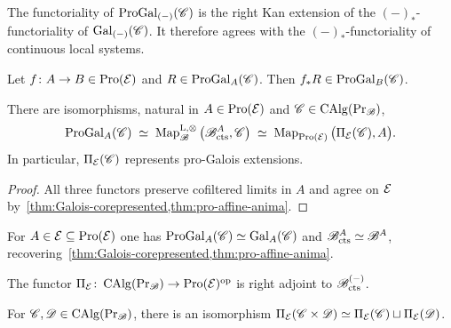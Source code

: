 \documentclass[english,svgnames,table]{article}
\begin{document}
    The functoriality of $\mathrm{ProGal}_{(-)}(\mathscr{C})$ is the right Kan extension of the $(-)_*$-functoriality of $\mathrm{Gal}_{(-)}(\mathscr{C})$. It therefore agrees with the $(-)_*$-functoriality of continuous local systems.

    \begin{corollary}
        Let $f \colon A \to B \in \operatorname{Pro}(\mathcal{E})$ and $R \in \mathrm{ProGal}_A(\mathscr{C})$. Then $f_* R \in \mathrm{ProGal}_B(\mathscr{C})$.
    \end{corollary}

    \begin{proposition}
    \label{prop:pro-Galois-classification}
        There are isomorphisms, natural in $A \in \operatorname{Pro}(\mathcal{E})$ and $\mathscr{C} \in \operatorname{CAlg}(\operatorname{Pr}_{\mathscr{B}})$,
        \begin{equation*}
                \mathrm{ProGal}_A(\mathscr{C})
                \;\simeq\; \operatorname{Map}^{\mathrm{L},\otimes}_{\mathscr{B}}\big(\mathscr{B}_{\mathrm{cts}}^A, \mathscr{C}\big)
                \;\simeq\; \operatorname{Map}_{\operatorname{Pro}(\mathcal{E})}\big(\Pi_{\mathcal{E}}(\mathscr{C}), A\big).
        \end{equation*}
        In particular, $\Pi_{\mathcal{E}}(\mathscr{C})$ represents pro-Galois extensions.
    \end{proposition}
    \begin{proof}
        All three functors preserve cofiltered limits in $A$ and agree on $\mathcal{E}$ by~\cref{thm:Galois-corepresented,thm:pro-affine-anima}.
    \end{proof}

    For $A \in \mathcal{E} \subseteq \operatorname{Pro}(\mathcal{E})$ one has $\mathrm{ProGal}_A(\mathscr{C}) \simeq \mathrm{Gal}_A(\mathscr{C})$ and $\mathscr{B}^A_{\mathrm{cts}} \simeq \mathscr{B}^A$, recovering~\cref{thm:Galois-corepresented,thm:pro-affine-anima}.

    \begin{corollary}
    \label{cor:piT-right-adjoint}
        The functor $\Pi_{\mathcal{E}} \colon \operatorname{CAlg}(\operatorname{Pr}_{\mathscr{B}}) \to \operatorname{Pro}(\mathcal{E})^{\mathrm{op}}$ is right adjoint to $\mathscr{B}_{\mathrm{cts}}^{(-)}$.
    \end{corollary}

    \begin{corollary}
       For $\mathscr{C}, \mathscr{D} \in \operatorname{CAlg}(\operatorname{Pr}_{\mathscr{B}})$, there is an isomorphism $\Pi_{\mathcal{E}}(\mathscr{C} \times \mathscr{D}) \simeq \Pi_{\mathcal{E}}(\mathscr{C}) \sqcup \Pi_{\mathcal{E}}(\mathscr{D})$.
    \end{corollary}
\end{document}
